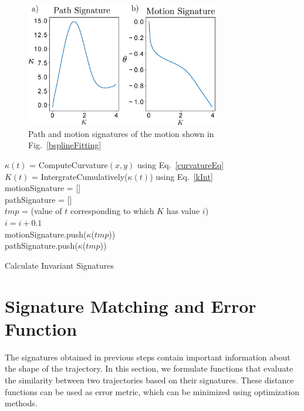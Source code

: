 \documentclass[twocolumn,10pt]{asme2e}
\begin{document}
\begin{figure}
\centering
\includegraphics[width=240pt]{figure/fig_signatures.eps}
  \caption{Path and motion signatures of the motion shown in Fig.~\ref{bsplineFitting}}
\label{signature}
\end{figure}


\begin{algorithm}
    $\kappa(t)$ = ComputeCurvature$(x, y)$ using Eq.~\ref{curvatureEq} \\
    $K(t)$ = IntergrateCumulatively($\kappa(t)$) using Eq.~\ref{kInt} \\
    motionSignature = [] \\
    pathSignature = [] \\
    {
      $tmp$ = (value of $t$ corresponding to which $K$ has value $i$) \\
      $i = i + 0.1$ \\
      motionSignature.push($\kappa$($tmp$)) \\
      pathSignature.push($\kappa$($tmp$))
    }
    \caption{Calculate Invariant Signatures}
    \label{alg_signature}
\end{algorithm}

\section{Signature Matching and Error Function}\label{sec_distanceMetric}
The signatures obtained in previous steps contain important information about the shape of the trajectory.
In this section, we formulate functions that evaluate the similarity between two trajectories based on their signatures.
These distance functions can be used as error metric, which can be minimized using optimization methods.
\end{document}
